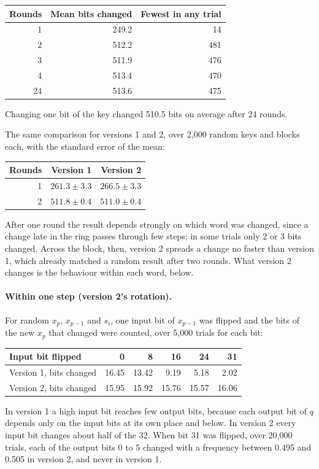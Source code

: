 \begin{center}
\begin{tabular}{rrr}
\hline
\textbf{Rounds} & \textbf{Mean bits changed} & \textbf{Fewest in any trial} \\
\hline
1  & 249.2 & 14 \\
2  & 512.2 & 481 \\
3  & 511.9 & 476 \\
4  & 513.4 & 470 \\
24 & 513.6 & 475 \\
\hline
\end{tabular}
\end{center}
Changing one bit of the key changed 510.5 bits on average after 24 rounds.

The same comparison for versions 1 and 2, over 2,000 random keys and blocks
each, with the standard error of the mean:

\begin{center}
\begin{tabular}{rrr}
\hline
\textbf{Rounds} & \textbf{Version 1} & \textbf{Version 2} \\
\hline
1 & $261.3 \pm 3.3$ & $266.5 \pm 3.3$ \\
2 & $511.8 \pm 0.4$ & $511.0 \pm 0.4$ \\
\hline
\end{tabular}
\end{center}
After one round the result depends strongly on which word was changed, since a
change late in the ring passes through few steps; in some trials only 2 or 3
bits changed. Across the block, then, version 2 spreads a change no faster than
version 1, which already matched a random result after two rounds. What version
2 changes is the behaviour within each word, below.

\paragraph{Within one step (version 2's rotation).} For random $x_p$, $x_{p-1}$
and $s_i$, one input bit of $x_{p-1}$ was flipped and the bits of the new $x_p$
that changed were counted, over 5,000 trials for each bit:

\begin{center}
\begin{tabular}{lrrrrr}
\hline
\textbf{Input bit flipped} & \textbf{0} & \textbf{8} & \textbf{16} & \textbf{24} & \textbf{31} \\
\hline
Version 1, bits changed & 16.45 & 13.42 & 9.19 & 5.18 & 2.02 \\
Version 2, bits changed & 15.95 & 15.92 & 15.76 & 15.57 & 16.06 \\
\hline
\end{tabular}
\end{center}
In version 1 a high input bit reaches few output bits, because each output bit
of $q$ depends only on the input bits at its own place and below. In version 2
every input bit changes about half of the 32. When bit 31 was flipped, over
20,000 trials, each of the output bits 0 to 5 changed with a frequency between
0.495 and 0.505 in version 2, and never in version 1.

